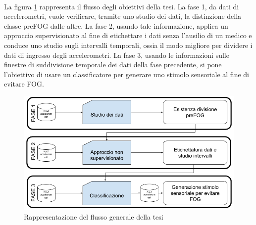 \\ La figura \ref{FlussoTesiGenerale} rappresenta il flusso degli obiettivi della tesi. La fase 1, da dati di accelerometri, vuole verificare, tramite uno studio dei dati, la distinzione della classe preFOG dalle altre. 
La fase 2, usando tale informazione, applica un approccio supervisionato al fine di etichettare i dati senza l'ausilio di un medico e conduce uno studio sugli intervalli temporali, ossia il modo migliore per dividere i dati di ingresso degli accelerometri. La fase 3, usando le informazioni sulle finestre di suddivisione temporale dei dati della fase precedente, si pone l'obiettivo di usare un classificatore per generare uno stimolo sensoriale al fine di evitare FOG.
\begin{figure}[]
	\centering
	\includegraphics[scale=0.46]{images/FlussoTesiGenerale.png}
	\caption{Rappresentazione del flusso generale della tesi}
	\label{FlussoTesiGenerale}
\end{figure}

